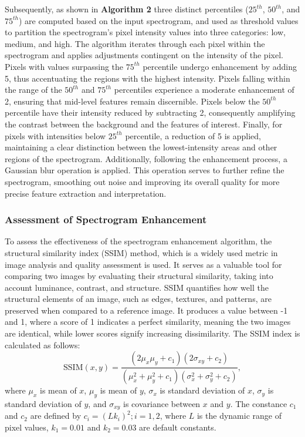 \documentclass[applsci,article,accept,moreauthors,pdftex]{Definitions/mdpi}
\begin{document}
Subsequently, as shown in {\bf Algorithm 2} three distinct percentiles ($25^{th}$, $50^{th}$, and $75^{th}$) are computed based on the input spectrogram, and used as threshold values to partition the spectrogram's pixel intensity values into three categories: low, medium, and high.
The algorithm iterates through each pixel within the spectrogram and applies adjustments contingent on the intensity of the pixel. Pixels with values surpassing the $75^{th}$ percentile undergo enhancement by adding 5, thus accentuating the regions with the highest intensity. Pixels falling within the range of the $50^{th}$ and $75^{th}$ percentiles experience a moderate enhancement of 2, ensuring that mid-level features remain discernible. Pixels below the $50^{th}$ percentile have their intensity reduced by subtracting 2, consequently amplifying the contrast between the background and the features of interest. Finally, for pixels with intensities below $25^{th}$ percentile, a reduction of 5 is applied, maintaining a clear distinction between the lowest-intensity areas and other regions of the spectrogram.
Additionally, following the enhancement process, a Gaussian blur operation is applied. This operation serves to further refine the spectrogram, smoothing out noise and improving its overall quality for more precise feature extraction and interpretation.
\subsubsection{Assessment of Spectrogram Enhancement}
To assess the effectiveness of the spectrogram enhancement algorithm, the structural similarity index (SSIM) method, which is a widely used metric in image analysis and quality assessment \cite{wang2004image} is used. It serves as a valuable tool for comparing two images by evaluating their structural similarity, taking into account luminance, contrast, and structure. SSIM quantifies how well the structural elements of an image, such as edges, textures, and patterns, are preserved when compared to a reference image. It produces a value between -1 and 1, where a score of 1 indicates a perfect similarity, meaning the two images are identical, while lower scores signify increasing dissimilarity. The SSIM index is calculated as follows:
\begin{equation}
	\text{SSIM}(x, y) = \frac{{(2\mu_x\mu_y + c_1)(2\sigma_{xy} + c_2)}}{{(\mu_x^2 + \mu_y^2 + c_1)(\sigma_x^2 + \sigma_y^2 + c_2)}},
\end{equation}
where $\mu_x$ is mean of $x$, $\mu_y$ is mean of $y$, $\sigma_x$ is standard deviation of $x$, $\sigma_y$ is standard deviation of $y$, and $\sigma_{xy}$ is covariance between $x$ and $y$. The constance $c_1$ and $c_2$ are defined by $c_i=(Lk_i)^2; i=1,2$, where $L$ is the dynamic range of pixel values, $k_1=0.01$ and $k_2= 0.03$ are default constants.
\end{document}

